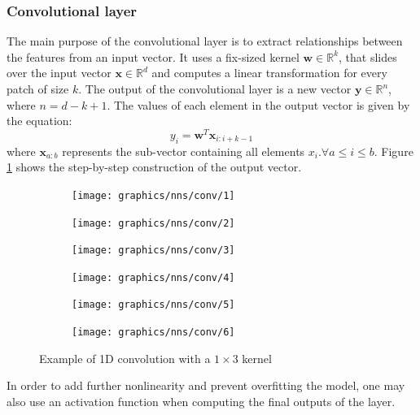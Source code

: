 	\subsubsection*{Convolutional layer}
	The main purpose of the convolutional layer is to extract relationships between the features from an input vector. It uses a fix-sized kernel $\mathbf{w} \in \mathbb{R}^k$, that slides over the input vector $\mathbf{x}\in\mathbb{R}^d$ and computes a linear transformation for every patch of size $k$. The output of the convolutional layer is a new vector $\mathbf{y}\in\mathbb{R}^n$, where $n=d - k + 1$. The values of each element in the output vector is given by the equation:
	\begin{equation}
		y_i = \mathbf{w}^T\mathbf{x}_{i:i+k-1}
	\end{equation}
	where $\mathbf{x}_{a:b}$ represents the sub-vector containing all elements $x_i. \forall a\leq i \leq b$. Figure \ref{Fig: prep/ml/cnn/convoLayer} shows the step-by-step construction of the output vector.
	\begin{figure}[H]
		\centering
		\begin{subfigure}[b]{0.3\linewidth}
			\texttt{[image: graphics/nns/conv/1]}
			\vspace*{1cm}
		\end{subfigure}
		\begin{subfigure}[b]{0.3\linewidth}
			\texttt{[image: graphics/nns/conv/2]}
			\vspace*{1cm}
		\end{subfigure}
		\begin{subfigure}[b]{0.3\linewidth}
			\texttt{[image: graphics/nns/conv/3]}
			\vspace*{1cm}
		\end{subfigure}
		\begin{subfigure}[b]{0.3\linewidth}
			\texttt{[image: graphics/nns/conv/4]}
		\end{subfigure}
		\begin{subfigure}[b]{0.3\linewidth}
			\texttt{[image: graphics/nns/conv/5]}
		\end{subfigure}
		\begin{subfigure}[b]{0.3\linewidth}
			\texttt{[image: graphics/nns/conv/6]}
		\end{subfigure}
		\caption[1D Convolution]{Example of 1D convolution with a $1\times3$ kernel}
		\label{Fig: prep/ml/cnn/convoLayer}
	\end{figure}
	In order to add further nonlinearity and prevent overfitting the model, one may also use an activation function when computing the final outputs of the layer. 
